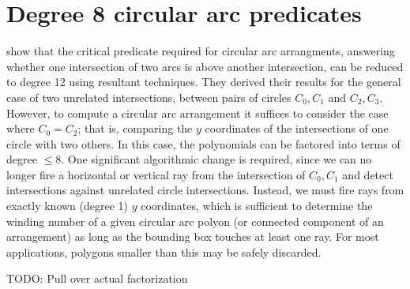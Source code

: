 \documentclass[11pt]{article}
\newcommand{\TODO}{{\color{red} TODO}}
\begin{document}
\section{Degree 8 circular arc predicates} \label{sec:predicates}

\cite{devillers2000algebraic} show that the critical predicate required for circular arc arrangments, answering whether one intersection of two arcs is above another intersection,
can be reduced to degree 12 using resultant techniques.  They derived their results for the general case of two unrelated intersections, between pairs of circles
$C_0,C_1$ and $C_2,C_3$.  However, to compute a circular arc arrangement it suffices to consider the case where $C_0 = C_2$; that is, comparing the $y$ coordinates of the
intersections of one circle with two others.  In this case, the polynomials can be factored into terms of degree $\le 8$.  One significant algorithmic change is required,
since we can no longer fire a horizontal or vertical ray from the intersection of $C_0,C_1$ and detect intersections against unrelated circle intersections.  Instead, we must fire
rays from exactly known (degree 1) $y$ coordinates, which is sufficient to determine the winding number of a given circular arc polyon (or connected component of an arrangement)
as long as the bounding box touches at least one ray.  For most applications, polygons smaller than this may be safely discarded.

\TODO: Pull over actual factorization
\end{document}
